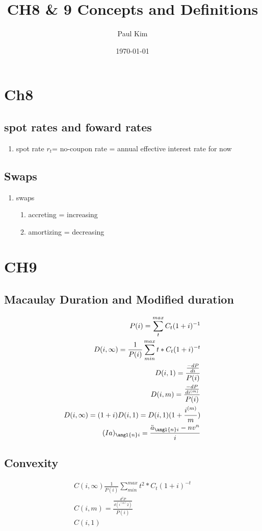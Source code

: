 \documentclass[12pt]{article}
\begin{document}
	
\title{CH8 \& 9 Concepts and Definitions}
\author{Paul Kim}
\date{\today}
\maketitle
\section{Ch8}
\subsection{spot rates and foward rates}
\begin{enumerate}
	\item spot rate $r_t$= no-coupon rate = annual effective interest rate for now
\end{enumerate}

\subsection{Swaps}
\begin{enumerate}
	\item swaps
	\begin{enumerate}
		\item accreting = increasing
		\item amortizing = decreasing
	\end{enumerate}
\end{enumerate}


\section{CH9}
\subsection{Macaulay Duration and Modified duration }
\begin{align}
	P(i) = \sum_{t}^{max}C_t(1+i)^{-1} \nonumber \\
	D(i, \infty) = \frac{1}{P(i)}\sum_{min}^{max}t*C_t(1+i)^{-t} \nonumber \\
	D(i,1) = \frac{\frac{-dP}{di}}{P(i)} \nonumber \\
	D(i,m) = \frac{\frac{-dP}{di^{(m)}}}{P(i)} \nonumber \\
	D(i, \infty) = (1+i)D(i,1) = D(i,1)(1 + \frac{i^{(m)}}{m}) \nonumber \\
	(Ia)_{\angl{n}i} = \frac{\ddot{a}_{\angl{n}i} - nv^n}{i} \nonumber
\end{align}
\subsection{Convexity}
\begin{align}
	C(i, \infty) \frac{1}{P(i)} \sum_{min}^{max}t^2*C_t(1+i)^{-t} \nonumber \\
	C(i,m) = \frac{\frac{d^2P}{d(i^{(m)}2)}}{P(i)} \nonumber \\
	C(i,1)
\end{align}
\end{document}
